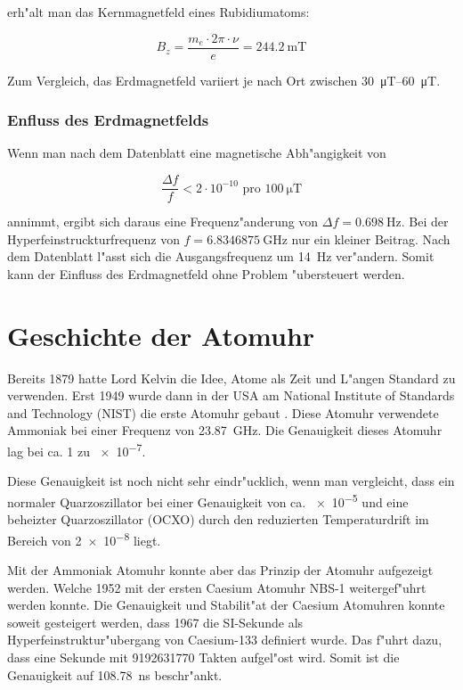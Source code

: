 \begin{refsection}
erh"alt man das Kernmagnetfeld eines Rubidiumatoms:

\begin{equation*}
  B_z = \dfrac{m_e\cdot2\pi\cdot\nu}{e} = \SI{244.2}{\milli\tesla}
\end{equation*}

Zum Vergleich, das Erdmagnetfeld variiert je nach Ort zwischen
\SIrange[range-phrase={ bis }, range-units=single]{30}{60}{\micro\tesla}.

\subsubsection{Enfluss des Erdmagnetfelds}
Wenn man nach dem Datenblatt \cite{datasheet:prs10m} eine magnetische
Abh"angigkeit von

\begin{equation*}
  \dfrac{\Delta f}{f} < 2\cdot 10^{-10} \text{ pro } \SI{100}{\micro\tesla}
\end{equation*}

annimmt, ergibt sich daraus eine Frequenz"anderung von \(\Delta
f=\SI{0.698}{\hertz}\).  Bei der Hyperfeinstruckturfrequenz von \(f =
\SI{6.8346875}{\giga\hertz}\) nur ein kleiner Beitrag.  Nach dem
Datenblatt l"asst sich die Ausgangsfrequenz um \SI{14}{\hertz}
ver"andern.  Somit kann der Einfluss des Erdmagnetfeld ohne Problem
"ubersteuert werden.

\section{Geschichte der Atomuhr}
\label{sec:gesch-der-atom}
Bereits 1879 hatte Lord Kelvin die Idee, Atome als Zeit und L"angen
Standard zu verwenden.  Erst 1949 wurde dann in der USA am National
Institute of Standards and Technology (NIST) die erste Atomuhr gebaut
\cite{ieee:nist}.  Diese Atomuhr verwendete Ammoniak bei einer
Frequenz von \SI{23.87}{\giga\hertz}.  Die Genauigkeit dieses Atomuhr
lag bei ca. 1 zu \num{e-7}.

Diese Genauigkeit ist noch nicht sehr eindr"ucklich, wenn man
vergleicht, dass ein normaler Quarzoszillator bei einer Genauigkeit
von ca. \num{e-5} und eine beheizter Quarzoszillator (OCXO) durch den
reduzierten Temperaturdrift im Bereich von \num{2e-8} liegt.

Mit der Ammoniak Atomuhr konnte aber das Prinzip der Atomuhr
aufgezeigt werden.  Welche 1952 mit der ersten Caesium Atomuhr NBS-1
weitergef"uhrt werden konnte.  Die Genauigkeit und Stabilit"at der
Caesium Atomuhren konnte soweit gesteigert werden, dass 1967 die
SI-Sekunde als Hyperfeinstruktur"ubergang von Caesium-133 definiert
wurde.  Das f"uhrt dazu, dass eine Sekunde mit \num{9192631770} Takten
aufgel"ost wird.  Somit ist die Genauigkeit auf
\SI{108.78}{\nano\second} beschr"ankt.


\end{refsection}
